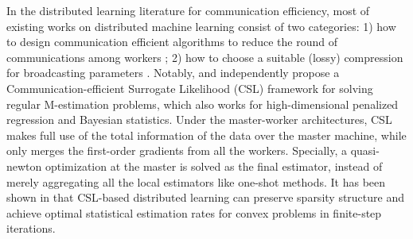 \documentclass[12pt,a4paper]{article}%
\numberwithin{equation}{section}
\begin{document}

In the distributed learning literature for communication efficiency, most of existing works on distributed machine learning consist of  two categories: 1) how to design communication efficient algorithms to reduce the round of communications among
workers \citep*{JordanLeeYang2019,KoneMY2016,LeeLinMY2017,Shamiretal2014}; 2) how to choose a suitable (lossy) compression for broadcasting  parameters \citep*{WangWangS2017}.
Notably, \cite{JordanLeeYang2019} and \cite{WangKolarSZ2017} independently propose a Communication-efficient Surrogate Likelihood (CSL) framework for solving  regular M-estimation problems, which also works for high-dimensional penalized regression and Bayesian statistics. Under the master-worker architectures, CSL makes full use of the total information of the data over the master  machine, while only merges the first-order gradients from all the workers.
Specially, a quasi-newton optimization at the master is solved as the final estimator, instead of merely aggregating all the local estimators like one-shot methods. It has been shown in \citep*{JordanLeeYang2019,WangKolarSZ2017} that
  CSL-based distributed learning can preserve sparsity structure and achieve optimal statistical estimation rates for convex problems in finite-step iterations.
\end{document}
